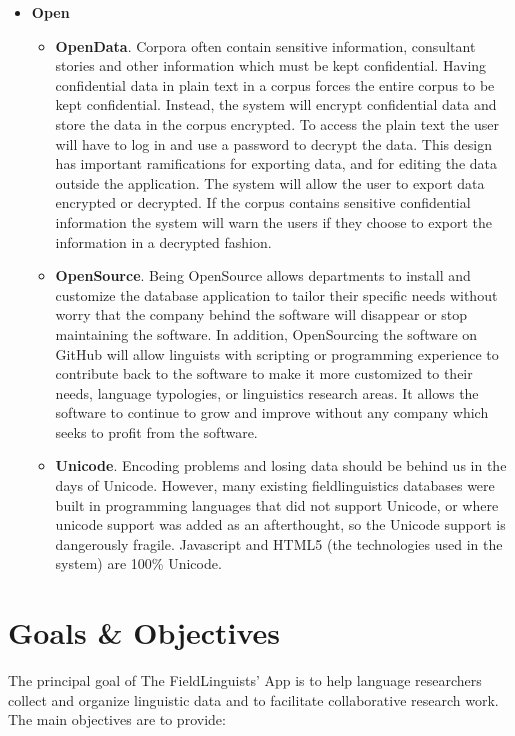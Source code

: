 \documentclass[12 pt]{article}
\begin{document}
\begin{itemize}
\item{\bf Open}
\begin{itemize}
\item {\bf OpenData}. Corpora often contain sensitive information, consultant stories and other information which must be kept confidential. Having confidential data in plain text in a corpus forces the entire corpus to be kept confidential. Instead, the system will encrypt confidential data and store the data in the corpus encrypted. To access the plain text the user will have to log in and use a password to decrypt the data. This design has important ramifications for exporting data, and for editing the data outside the application. The system will allow the user to export data encrypted or decrypted. If the corpus contains sensitive confidential information the system will warn the users if they choose to export the information in a decrypted fashion.
\item { \bf OpenSource}. Being OpenSource allows departments to install and customize the database application to tailor their specific needs without worry that the company behind the software will disappear or stop maintaining the software. In addition, OpenSourcing the software on GitHub will allow linguists with scripting or programming experience to contribute back to the software to make it more customized to their needs, language typologies, or linguistics research areas. It allows the software to continue to grow and improve without any company which seeks to profit from the software.
\item {\bf Unicode}. Encoding problems and losing data should be behind us in the days of Unicode. However, many existing fieldlinguistics databases were built in programming languages that did not support Unicode, or where unicode support was added as an afterthought, so the Unicode support is dangerously fragile. Javascript and HTML5 (the technologies used in the system) are 100\% Unicode.
\end{itemize}

\end{itemize}


\section {Goals \& Objectives}

The principal goal of The FieldLinguists' App is to help language researchers collect and organize linguistic data and to facilitate collaborative research work. The main objectives are to provide: 
\end{document}
